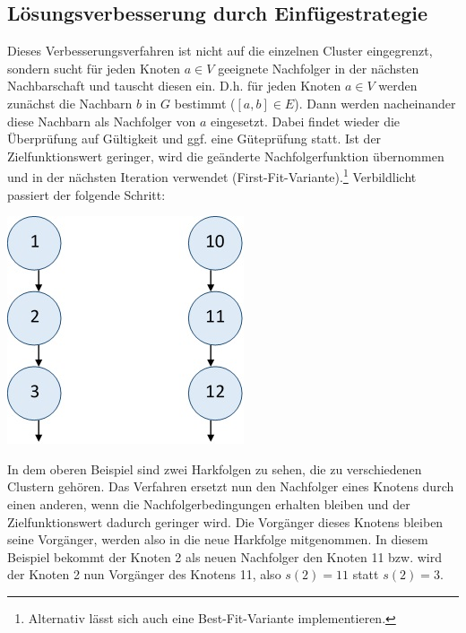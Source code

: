 \documentclass[fontsize=12pt,doubleside,openany,listof=totoc,listof=flat,listof=nochaptergap,numbers=noenddot]{scrbook}
\theoremstyle{style}
\begin{document}
\subsection{Lösungsverbesserung durch Einfügestrategie}
\label{subsectionEinfügestrategie}

Dieses Verbesserungsverfahren ist nicht auf die einzelnen Cluster eingegrenzt, sondern sucht 
für jeden Knoten $a \in V$ geeignete Nachfolger in der nächsten Nachbarschaft und tauscht diesen ein. D.h. für jeden Knoten $a \in V$ werden zunächst die Nachbarn $b$ in $G$ bestimmt ($[a,b] \in E$). Dann werden nacheinander diese Nachbarn als Nachfolger von $a$ eingesetzt.
Dabei findet wieder die Überprüfung auf Gültigkeit und ggf. eine Güteprüfung statt. 
Ist der Zielfunktionswert geringer, wird die geänderte Nachfolgerfunktion übernommen und in der nächsten Iteration verwendet (First-Fit-Variante).\footnote{Alternativ lässt sich auch eine Best-Fit-Variante implementieren.} Verbildlicht passiert der folgende Schritt:

\begin{center}
\begin{minipage}{\textwidth}
\centerline{\includegraphics[angle=0,scale=0.5]{Figures/Laub/Ausgangslage.jpg}}
\label{imageAusgangslage}
\end{minipage}
\end{center}

\noindent In dem oberen Beispiel sind zwei Harkfolgen zu sehen, die zu verschiedenen Clustern gehören. Das Verfahren ersetzt nun den Nachfolger eines Knotens durch einen anderen, wenn die Nachfolgerbedingungen erhalten bleiben und der Zielfunktionswert dadurch geringer wird. Die Vorgänger dieses Knotens bleiben seine Vorgänger, werden also in die neue Harkfolge mitgenommen. In diesem Beispiel bekommt der Knoten 2 als neuen Nachfolger den Knoten 11 bzw. wird der Knoten 2 nun Vorgänger des Knotens 11, also $s(2)=11$ statt $s(2)=3$.
\end{document}
